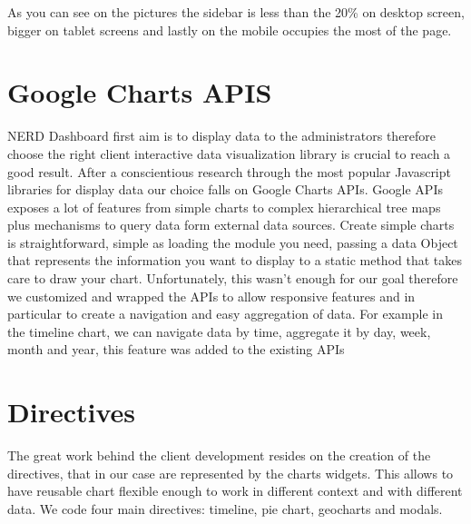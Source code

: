 \documentclass[a4paper,13pt]{report}
\begin{document}
As you can see on the pictures the sidebar is less than the 20\% on desktop screen, bigger on tablet screens and lastly on the mobile occupies the most of the page.
\section{Google Charts APIS}
NERD Dashboard first aim is to display data to the administrators therefore choose the right client interactive data visualization library is crucial to reach a good result.
After a  conscientious research through the most popular Javascript libraries for display data our choice falls on Google Charts APIs.
Google APIs exposes a lot of features from simple charts to complex hierarchical tree maps plus mechanisms to query data form external data sources.
Create simple charts is straightforward, simple as loading the module you need, passing a data Object that represents the information you want to display to a static method that takes care to draw your chart.
Unfortunately, this wasn't enough for our goal therefore we customized and wrapped the APIs to allow responsive features and in particular to create a navigation and easy aggregation of data. For example in the timeline chart, we can navigate data by time, aggregate it by day, week, month and year, this feature was added to the existing APIs 

\section{Directives}
The great work behind the client development resides on the creation of the directives, that in our case are represented by the charts widgets.
This allows to have reusable chart flexible enough to work in different context and with different data.
We code four main directives: timeline, pie chart, geocharts and modals.
\end{document}
